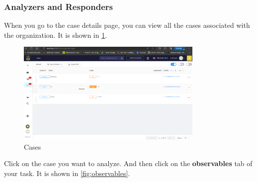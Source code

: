 \documentclass{article}
\begin{document}
\subsubsection{Analyzers and Responders}
When you go to the case details page, you can view all the cases associated with the organization.
It is shown in \ref{fig:cases}.
\begin{figure}[H]
    \centering
    \includegraphics[width=0.8\textwidth]{img27.png}
    \caption{Cases}
    \label{fig:cases}
\end{figure}

 Click on the case you want to analyze. And then click on the \textbf{observables} tab of your task. It is shown in \ref{fig:observables}.
\end{document}
